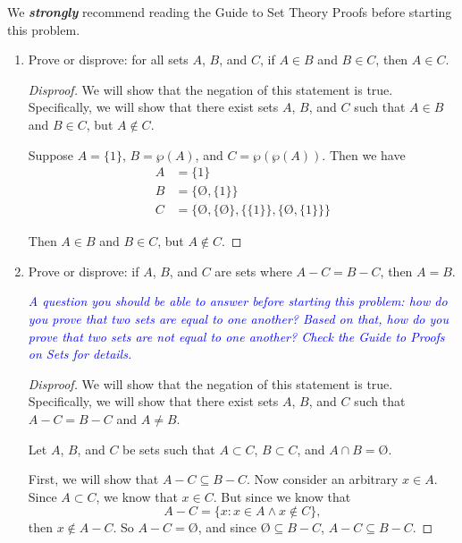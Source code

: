 \documentclass{article}
\renewcommand{\(}{\left(}
\renewcommand{\)}{\right)}
\renewcommand{\emptyset}{\text{\O}}
\renewcommand{\emph}[1]{\textit{\textbf{#1}}}
\theoremstyle{plain}
\theoremstyle{plain}
\theoremstyle{definition}
\begin{document}
We \emph{strongly} recommend reading the Guide to Set Theory Proofs before starting this problem.

\begin{enumerate}[label*=\roman*.,ref=\roman*]

\item Prove or disprove: for all sets $A$, $B$, and $C$,
if $A \in B$ and $B \in C$, then $A \in C$.

\begin{shaded}
\begin{proof}[Disproof]
	We will show that the negation of this statement is true. Specifically, we will show that there exist sets $A$, $B$, and $C$ such that $A \in B$ and $B \in C$, but $A \notin C$.
	
	Suppose $A = \{1\}$, $B = \wp(A)$, and $C = \wp(\wp(A))$. Then we have
	\begin{equation*}
	\begin{aligned}
	A & = \{1\} \\
	B & = \{\emptyset, \{1\}\} \\
	C & = \{\emptyset, \{\emptyset\}, \{\{1\}\}, \{\emptyset, \{1\}\} \}
	\end{aligned}
	\end{equation*}
	
	Then $A \in B$ and $B \in C$, but $A \notin C$.
\end{proof}

\end{shaded}

\item Prove or disprove: if $A$, $B$, and $C$ are sets where $A - C = B - C$, then $A = B$.

\textit{\textcolor{blue}{A question you should be able to answer before starting this problem: how do you prove that two sets are equal to one another? Based on that, how do you prove that two sets are not equal to one another? Check the Guide to Proofs on Sets for details.}}

\begin{shaded}
\begin{proof}[Disproof] We will show that the negation of this statement is true. Specifically, we will show that there exist sets $A$, $B$, and $C$ such that $A - C = B - C$ and $A \neq B$.
	
	Let $A$, $B$, and $C$ be sets such that $A \subset C$, $B \subset C$, and $A \cap B = \emptyset$.
	
	First, we will show that $A - C \subseteq B - C$. Now consider an arbitrary $x \in A$. Since $A \subset C$, we know that $x \in C$. But since we know that $$A - C = \{x: x \in A \land x \notin C \},$$ then $x \notin A-C$. So $A - C = \emptyset$, and since $\emptyset \subseteq B - C$, $ A - C \subseteq B - C$. 
	

\end{proof}
\end{shaded}
\end{enumerate}
\end{document}
